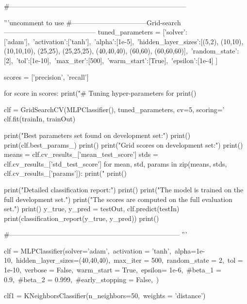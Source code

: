 \documentclass[12pt]{article}
\begin{document}
\begin{python}
#------------------------------------------------------------------------------


'''uncomment to use
#---------------------------------Grid-search-----------------------------------------
tuned_parameters = [{'solver':['adam'],\
 'activation':['tanh'],\
 'alpha':[1e-5],\
  'hidden_layer_sizes':[(5,2), (10,10), (10,10,10), (25,25), (25,25,25), (40,40,40), (60,60), (60,60,60)],\
   'random_state': [2],\
   'tol':[1e-10],\
   'max_iter':[500],\
   'warm_start':[True],\
   'epsilon':[1e-4] }]


scores = ['precision', 'recall']

for score in scores:
    print("# Tuning hyper-parameters for %
    print()

    clf = GridSearchCV(MLPClassifier(), tuned_parameters, cv=5,
                       scoring='%
    clf.fit(trainIn, trainOut)

    print("Best parameters set found on development set:")
    print()
    print(clf.best_params_)
    print()
    print("Grid scores on development set:")
    print()
    means = clf.cv_results_['mean_test_score']
    stds = clf.cv_results_['std_test_score']
    for mean, std, params in zip(means, stds, clf.cv_results_['params']):
        print("%
    print()

    print("Detailed classification report:")
    print()
    print("The model is trained on the full development set.")
    print("The scores are computed on the full evaluation set.")
    print()
    y_true, y_pred = testOut, clf.predict(testIn)
    print(classification_report(y_true, y_pred))
    print()




#---------------------------------------------------------------------------
'''

clf = MLPClassifier(solver='adam',\
                    activation = 'tanh',\
                    alpha=1e-10,\
                    hidden_layer_sizes=(40,40,40),\
                     max_iter = 500,\
                      random_state = 2,\
                      tol = 1e-10,\
                      verbose = False,\
                       warm_start = True,\
                        epsilon= 1e-6,\
                        #beta_1 = 0.9,\
                        #beta_2 = 0.999,\
                        #early_stopping = False,\
                        )


clf1 = KNeighborsClassifier(n_neighbors=50,\
                            weights = 'distance')


\end{python}
\end{document}
